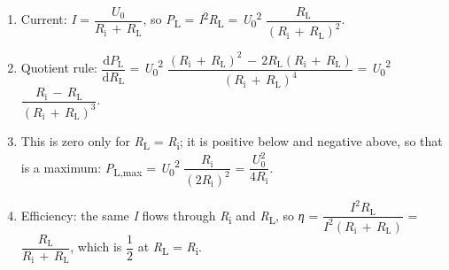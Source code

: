 \documentclass[11pt]{article}
\begin{document}
\begin{keepsection}
\begin{keepsection}
\begin{enumerate}
\item Current: \textit{I} = {\small\ensuremath{\dfrac{{U}_{0}}{{R}_{\mathrm{i}}\, +\, {R}_{\mathrm{L}}}}}, so \textit{P}\textsubscript{L} = \textit{I}\textsuperscript{2}\textit{R}\textsubscript{L} = \textit{U}\textsubscript{0}\textsuperscript{2} {\small\ensuremath{\dfrac{{R}_{\mathrm{L}}}{({R}_{\mathrm{i}}\, +\, {R}_{\mathrm{L}})^{2}}}}.
\item Quotient rule: {\small\ensuremath{\dfrac{\mathrm{d}{P}_{\mathrm{L}}}{\mathrm{d}{R}_{\mathrm{L}}}}} = \textit{U}\textsubscript{0}\textsuperscript{2} {\small\ensuremath{\dfrac{({R}_{\mathrm{i}}\, +\, {R}_{\mathrm{L}})^{2}\, -\, 2{R}_{\mathrm{L}}({R}_{\mathrm{i}}\, +\, {R}_{\mathrm{L}})}{({R}_{\mathrm{i}}\, +\, {R}_{\mathrm{L}})^{4}}}} = \textit{U}\textsubscript{0}\textsuperscript{2} {\small\ensuremath{\dfrac{{R}_{\mathrm{i}}\, -\, {R}_{\mathrm{L}}}{({R}_{\mathrm{i}}\, +\, {R}_{\mathrm{L}})^{3}}}}.
\item This is zero only for \textit{R}\textsubscript{L} = \textit{R}\textsubscript{i}; it is positive below and negative above, so that is a maximum: \textit{P}\textsubscript{L,max} = \textit{U}\textsubscript{0}\textsuperscript{2} {\small\ensuremath{\dfrac{{R}_{\mathrm{i}}}{(2{R}_{\mathrm{i}})^{2}}}} = {\small\ensuremath{\dfrac{{U}_{0}^{2}}{4{R}_{\mathrm{i}}}}}.
\item Efficiency: the same \textit{I} flows through \textit{R}\textsubscript{i} and \textit{R}\textsubscript{L}, so \textit{η} = {\small\ensuremath{\dfrac{{I}^{2}{R}_{\mathrm{L}}}{{I}^{2}({R}_{\mathrm{i}}\, +\, {R}_{\mathrm{L}})}}} = {\small\ensuremath{\dfrac{{R}_{\mathrm{L}}}{{R}_{\mathrm{i}}\, +\, {R}_{\mathrm{L}}}}}, which is {\small\ensuremath{\dfrac{1}{2}}} at \textit{R}\textsubscript{L} = \textit{R}\textsubscript{i}.
\end{enumerate}


\end{keepsection}
\end{keepsection}
\end{document}

